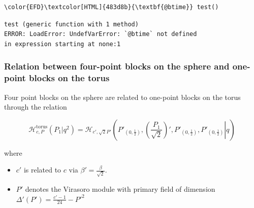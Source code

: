 \documentclass[a4paper]{article}
\numberwithin{equation}{section}
\begin{document}
\begin{Code}
\begin{Verbatim}
\color{EFD}\textcolor[HTML]{483d8b}{\textbf{@btime}} test()
\end{Verbatim}
\end{Code}

\begin{verbatim}
test (generic function with 1 method)
ERROR: LoadError: UndefVarError: `@btime` not defined
in expression starting at none:1
\end{verbatim}
\subsubsection*{Relation between four-point blocks on the sphere and one-point blocks on the torus}
\label{sec:org262e054}

Four point blocks on the sphere are related to one-point blocks on the torus through the relation

\[
\mathcal H^{\text{torus}}_{c, P}(P_{1} | q^{2}) = \mathcal H_{c', \sqrt{2}P'}\left(\left. P'_{(0,\frac12)}, \left(\frac{P_{1}}{\sqrt{2}}\right)', P'_{(0,\frac12)}, P'_{(0,\frac12)} \right| q \right)
\]

where
\begin{itemize}
\item \(c'\) is related to \(c\) via \(\beta'=\frac\beta{\sqrt 2}\).
\item \(P'\) denotes the Virasoro module with primary field of dimension \(\Delta'(P') = \frac{c'-1}{24} - P'^{2}\)
\end{itemize}
\end{document}
